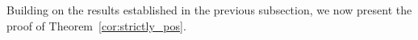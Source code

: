 \documentclass[12pt]{article}
\newcommand{\DiSOS}{\mathbf{\Sigma}}
\newcommand{\mbS}{\mathbb{S}}
\newcommand{\mcD}{\mathcal{D}}
\newtheorem{theorem}{Theorem}%
\theoremstyle{remark}
\begin{document}
Building on the results established in the previous subsection, we now present the proof of Theorem~\ref{cor:strictly_pos}.


\end{document}
